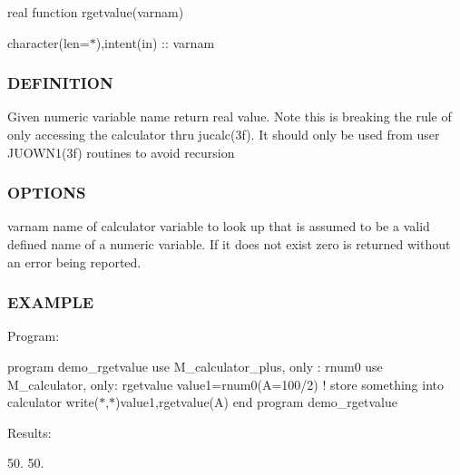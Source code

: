 real function rgetvalue(varnam)

character(len=$\ast$),intent(in) \+:\+: varnam

\subsubsection*{D\+E\+F\+I\+N\+I\+T\+I\+ON}

Given numeric variable name return real value. Note this is breaking the rule of only accessing the calculator thru jucalc(3f). It should only be used from user J\+U\+O\+W\+N1(3f) routines to avoid recursion \subsubsection*{O\+P\+T\+I\+O\+NS}

varnam name of calculator variable to look up that is assumed to be a valid defined name of a numeric variable. If it does not exist zero is returned without an error being reported.

\subsubsection*{E\+X\+A\+M\+P\+LE}

Program\+:

program demo\+\_\+rgetvalue use M\+\_\+calculator\+\_\+plus, only \+: rnum0 use M\+\_\+calculator, only\+: rgetvalue value1=rnum0(\textquotesingle{}A=100/2\textquotesingle{}) ! store something into calculator write($\ast$,$\ast$)value1,rgetvalue(\textquotesingle{}A\textquotesingle{}) end program demo\+\_\+rgetvalue

Results\+:

50. 50. \mbox{\label{namespacem__calculator_ade5ed0d5db38a14b2c521bc268756f39}} 
